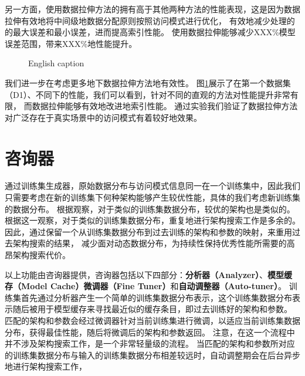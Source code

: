 另一方面，使用数据拉伸方法的{\li}拥有高于其他两种方法的性能表现，这是因为数据拉伸有效地将{\rmi}中间级{\model}地数据分配原则按照访问模式进行优化，
有效地减少处理{\hotkey}的{\model}的最大误差和最小误差，进而提高索引性能。
使用数据拉伸能够减少XXX\%模型误差范围，带来XXX\%地性能提升。

\begin{figure}[!htp]
  \centering
    {English caption}
  \label{fig:stretch-result}
\end{figure}

我们进一步在考虑更多地{\skewwl}下数据拉伸方法地有效性。
图\ref{fig:stretch-result}展示了在第一个数据集（D1）、不同{\skewwl}下{\li}的性能，我们可以看到，针对不同的{\skewwl}直观的方法对性能提升非常有限，
而数据拉伸能够有效地改进{\li}地索引性能。
通过实验我们验证了数据拉伸方法对广泛存在于真实场景中的访问模式有着较好地效果。

\section{咨询器}

通过训练集生成器，原始数据分布与访问模式信息同一在一个训练集中，因此我们只需要考虑在新的训练集下何种{\rmi}架构能够产生较优性能，具体的我们考虑新训练集的数据分布。
根据观察，对于类似的训练集数据分布，较优的{\rmi}架构也是类似的。
根据这一观察，对于类似的训练集数据分布，重复地进行架构搜索工作是多余的。
因此，{\sys}通过保留一个从训练集数据分布到过去训练的{\rmi}架构和参数的映射，来重用过去{\rmi}架构搜索的结果，
减少面对动态数据分布，为持续性保持{\li}优秀性能所需要的高昂架构搜索代价。


以上功能由咨询器提供，咨询器包括以下四部分：\textbf{分析器（Analyzer）}、\textbf{模型缓存（Model Cache）}\textbf{微调器（Fine Tuner）}和\textbf{自动调整器（Auto-tuner）}。
训练集首先通过分析器产生一个简单的训练集数据分布表示，这个训练集数据分布表示随后被用于模型缓存来寻找最近似的缓存条目，即过去训练好的{\rmi}架构和参数。
匹配的{\rmi}架构和参数会经过微调器针对当前训练集进行微调，以适应当前训练集数据分布，获得最佳性能，随后将微调后的{\rmi}架构和参数返回。
注意，在这一个流程中并不涉及架构搜索工作，是一个非常轻量级的流程。
当匹配的{\rmi}架构和参数所对应的训练集数据分布与输入的训练集数据分布相差较远时，自动调整期会在后台异步地进行架构搜索工作，


